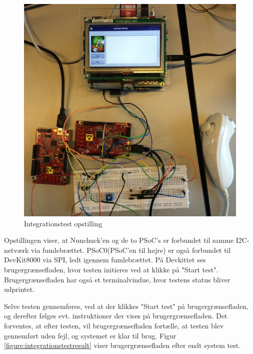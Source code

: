 \begin{figure}[H]
	\includegraphics[width=\textwidth]{Test/images/IntegrationstestProtokoller/opstilling}
	\caption{Integrationstest opstilling}
	\label{figure:IntegrationstestOpstilling}
\end{figure}

\noindent Opstillingen viser, at Nunchuck'en og de to PSoC's er forbundet til samme I2C-netværk via fumlebrættet. PSoC0(PSoC'en til højre) er også forbundet til DevKit8000 via SPI, ledt igennem fumlebrættet. På Devkittet ses brugergrænsefladen, hvor testen initieres ved at klikke på "Start test". Brugergrænsefladen har også et terminalvindue, hvor testens status bliver udprintet. \newline 

\noindent Selve testen gennemføres, ved at der klikkes "Start test" på brugergrænsefladen, og derefter følges evt. instruktioner der vises på brugergrænsefladen. Det forventes, at efter testen, vil brugergrænsefladen fortælle, at testen blev gennemført uden fejl, og systemet er klar til brug. Figur \ref{figure:integrationstestresult} viser brugergrænsefladen efter endt system test. \newline 

